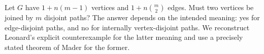 Let \(G\) have \(1+n(m-1)\) vertices and \(1+n\binom m2\) edges. Must two vertices be joined by \(m\) disjoint paths?
The answer depends on the intended meaning: yes for edge-disjoint paths, and no for internally vertex-disjoint paths. We reconstruct Leonard's explicit counterexample for the latter meaning and use a precisely stated theorem of Mader for the former.
